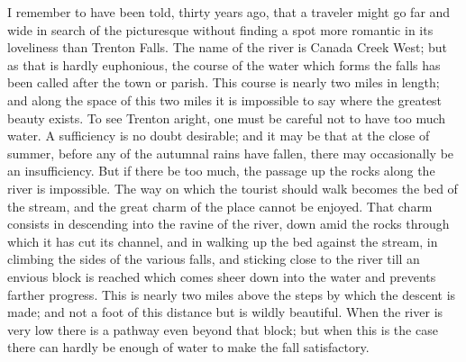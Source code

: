 I remember to have been told, thirty years ago, that a traveler
might go far and wide in search of the picturesque without finding
a spot more romantic in its loveliness than Trenton Falls.  The
name of the river is Canada Creek West; but as that is hardly
euphonious, the course of the water which forms the falls has been
called after the town or parish.  This course is nearly two miles
in length; and along the space of this two miles it is impossible
to say where the greatest beauty exists.  To see Trenton aright,
one must be careful not to have too much water.  A sufficiency is
no doubt desirable; and it may be that at the close of summer,
before any of the autumnal rains have fallen, there may
occasionally be an insufficiency.  But if there be too much, the
passage up the rocks along the river is impossible.  The way on
which the tourist should walk becomes the bed of the stream, and
the great charm of the place cannot be enjoyed.  That charm
consists in descending into the ravine of the river, down amid the
rocks through which it has cut its channel, and in walking up the
bed against the stream, in climbing the sides of the various falls,
and sticking close to the river till an envious block is reached
which comes sheer down into the water and prevents farther
progress.  This is nearly two miles above the steps by which the
descent is made; and not a foot of this distance but is wildly
beautiful.  When the river is very low there is a pathway even
beyond that block; but when this is the case there can hardly be
enough of water to make the fall satisfactory.

